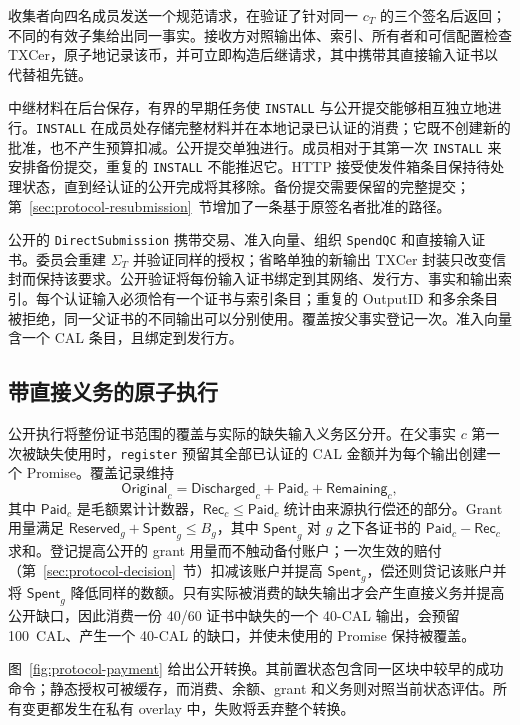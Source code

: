 收集者向四名成员发送一个规范请求，在验证了针对同一 $c_T$ 的三个签名后返回；不同的有效子集给出同一事实。接收方对照输出体、索引、所有者和可信配置检查 TXCer，原子地记录该币，并可立即构造后继请求，其中携带其直接输入证书以代替祖先链。

中继材料在后台保存，有界的早期任务使 \texttt{INSTALL} 与公开提交能够相互独立地进行。\texttt{INSTALL} 在成员处存储完整材料并在本地记录已认证的消费；它既不创建新的批准，也不产生预算扣减。公开提交单独进行。成员相对于其第一次 \texttt{INSTALL} 来安排备份提交，重复的 \texttt{INSTALL} 不能推迟它。HTTP 接受使发件箱条目保持待处理状态，直到经认证的公开完成将其移除。备份提交需要保留的完整提交；第~\ref{sec:protocol-resubmission}~节增加了一条基于原签名者批准的路径。

公开的 \texttt{DirectSubmission} 携带交易、准入向量、组织 \texttt{SpendQC} 和直接输入证书。委员会重建 $\Sigma_T$ 并验证同样的授权；省略单独的新输出 TXCer 封装只改变信封而保持该要求。公开验证将每份输入证书绑定到其网络、发行方、事实和输出索引。每个认证输入必须恰有一个证书与索引条目；重复的 OutputID 和多余条目被拒绝，同一父证书的不同输出可以分别使用。覆盖按父事实登记一次。准入向量含一个 CAL 条目，且绑定到发行方。

\subsection{带直接义务的原子执行}
\label{sec:protocol-execution}

公开执行将整份证书范围的覆盖与实际的缺失输入义务区分开。在父事实 $c$ 第一次被缺失使用时，\texttt{register} 预留其全部已认证的 CAL 金额并为每个输出创建一个 Promise。覆盖记录维持
\begin{equation}
  \mathsf{Original}_c=
  \mathsf{Discharged}_c+\mathsf{Paid}_c+\mathsf{Remaining}_c,
  \label{eq:protocol-coverage}
\end{equation}
其中 $\mathsf{Paid}_c$ 是毛额累计计数器，$\mathsf{Rec}_c\le\mathsf{Paid}_c$ 统计由来源执行偿还的部分。Grant 用量满足 $\mathsf{Reserved}_g+\mathsf{Spent}_g\le B_g$，其中 $\mathsf{Spent}_g$ 对 $g$ 之下各证书的 $\mathsf{Paid}_c-\mathsf{Rec}_c$ 求和。登记提高公开的 grant 用量而不触动备付账户；一次生效的赔付（第~\ref{sec:protocol-decision}~节）扣减该账户并提高 $\mathsf{Spent}_g$，偿还则贷记该账户并将 $\mathsf{Spent}_g$ 降低同样的数额。只有实际被消费的缺失输出才会产生直接义务并提高公开缺口，因此消费一份 40/60 证书中缺失的一个 40-CAL 输出，会预留 100~CAL、产生一个 40-CAL 的缺口，并使未使用的 Promise 保持被覆盖。

图~\ref{fig:protocol-payment} 给出公开转换。其前置状态包含同一区块中较早的成功命令；静态授权可被缓存，而消费、余额、grant 和义务则对照当前状态评估。所有变更都发生在私有 overlay 中，失败将丢弃整个转换。

